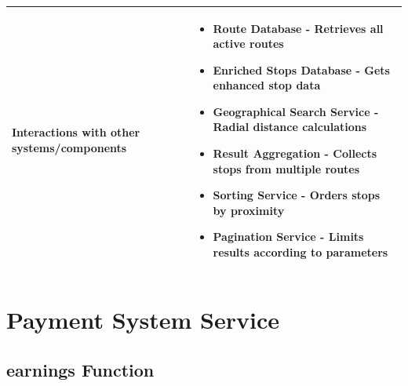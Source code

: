 \documentclass[11pt,a4paper]{article}
\begin{document}
\begin{longtable}{|p{3cm}|p{12cm}|}
\hline
\textbf{Interactions with other systems/components} & 
\begin{itemize}[nosep]
\item Route Database - Retrieves all active routes
\item Enriched Stops Database - Gets enhanced stop data
\item Geographical Search Service - Radial distance calculations
\item Result Aggregation - Collects stops from multiple routes
\item Sorting Service - Orders stops by proximity
\item Pagination Service - Limits results according to parameters
\end{itemize} \\
\hline
\end{longtable}

\section{Payment System Service}

\subsection{earnings Function}
\end{document}
